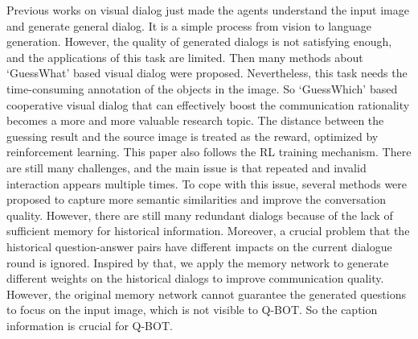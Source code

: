 \documentclass[review]{elsarticle}
\begin{document}
	Previous works \cite{DBLP:conf/cvpr/DasKGSYMPB17, guo2019dual} on visual dialog just made the agents understand the input image and generate general dialog. It is a simple process from vision to language generation.
	However, the quality of generated dialogs is not satisfying enough, and the applications of this task are limited.
	Then many methods \cite{DBLP:conf/coling/ShekharBVBBF18, DBLP:conf/naacl/ShekharVBBPBF19} about `GuessWhat' based visual dialog were proposed. 
	Nevertheless, this task needs the time-consuming annotation of the objects in the image.
	So `GuessWhich' based cooperative visual dialog \cite{DBLP:conf/iccv/DasKMLB17} that can effectively boost the communication rationality becomes a more and more valuable research topic. 
	The distance between the guessing result and the source image is treated as the reward, optimized by reinforcement learning. This paper also follows the RL training mechanism. 
	There are still many challenges, and the main issue is that repeated and invalid interaction appears multiple times. To cope with this issue, several methods \cite{DBLP:conf/nips/LuKYPB17, DBLP:conf/atal/AgarwalGSLS19, DBLP:conf/sigdial/ZhangZY18, DBLP:conf/emnlp/MurahariCBPD19} were proposed to capture more semantic similarities and improve the conversation quality. 
	However, there are still many redundant dialogs because of the lack of sufficient memory for historical information. Moreover, a crucial problem that the historical question-answer pairs have different impacts on the current dialogue round is ignored. Inspired by that, we apply the memory network to generate different weights on the historical dialogs to improve communication quality. However, the original memory network cannot guarantee the generated questions to focus on the input image, which is not visible to Q-BOT. So the caption information is crucial for Q-BOT.
	
\end{document}
